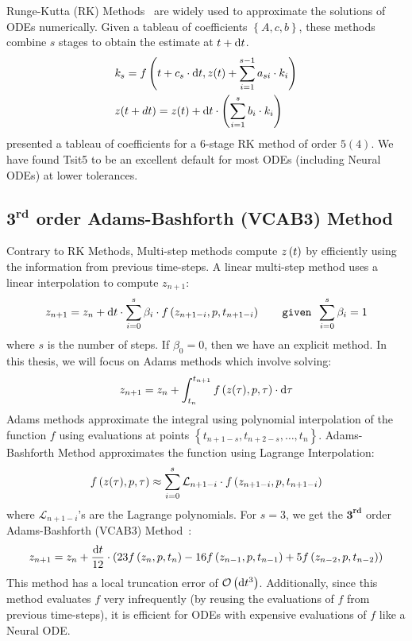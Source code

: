 Runge-Kutta (RK) Methods~\citep{runge1895numerische, kutta1901beitrag} are widely used to approximate the solutions of ODEs numerically. Given a tableau of coefficients $\left\{A, c, b\right\}$, these methods combine $s$ stages to obtain the estimate at $t + \mathrm{d}t$.
%
\begin{align}
   & k_s = f\left(t + c_s \cdot \mathrm{d}t, z(t) + \sum_{i = 1}^{s - 1} a_{si} \cdot k_i\right)                     \\
   & z(t + dt) = z(t) + \mathrm{d}t \cdot \left( \sum_{i = 1}^s b_i \cdot k_i \right) \label{eq:rk_method_tsit5}
\end{align}
%
\citet{tsitouras2011runge} presented a tableau of coefficients for a 6-stage RK method of order $5 (4)$. We have found Tsit5 to be an excellent default for most ODEs (including Neural ODEs) at lower tolerances. 

\subsection{$\mathbf{3^{rd}}$ order Adams-Bashforth (VCAB3) Method}
\label{subsec:vcab3_method}

Contrary to RK Methods, Multi-step methods compute $z\left(t\right)$ by efficiently using the information from previous time-steps. A linear multi-step method uses a linear interpolation to compute $z_{n + 1}$:
%
\begin{equation}
  z_{n + 1} = z_n + \mathrm{d}t \cdot \sum_{i = 0}^{s} \beta_i \cdot f\left(z_{n + 1 - i}, p, t_{n + 1 - i}\right) \qquad \texttt{given } \sum_{i = 0}^s \beta_i = 1
\end{equation}
%
where $s$ is the number of steps. If $\beta_0 = 0$, then we have an explicit method. In this thesis, we will focus on Adams methods which involve solving:
%
\begin{equation}
  z_{n + 1} = z_n + \int_{t_n}^{t_{n + 1}} f\left(z(\tau), p, \tau\right) \cdot \mathrm{d}\tau
\end{equation}
%
Adams methods approximate the integral using polynomial interpolation of the function $f$ using evaluations at points $\left\{ t_{n + 1 - s}, t_{n + 2 - s}, \dots, t_{n} \right\}$. Adams-Bashforth Method approximates the function using Lagrange Interpolation:
%
\begin{equation}
  f\left(z(\tau), p, \tau\right) \approx \sum_{i = 0}^{s} \mathcal{L}_{n + 1 - i} \cdot f\left(z_{n + 1 - i}, p, t_{n + 1 - i}\right)
\end{equation}
%
where $\mathcal{L}_{n + 1 - i}$'s are the Lagrange polynomials. For $s = 3$, we get the $\mathbf{3^{rd}}$ order Adams-Bashforth (VCAB3) Method~\citep{durran1991third}:
%
\begin{equation}
  z_{n + 1} = z_n + \frac{\mathrm{d}t}{12} \cdot \left( 23 f\left(z_n, p, t_n\right) - 16 f\left(z_{n - 1}, p, t_{n - 1}\right) + 5 f\left(z_{n - 2}, p, t_{n - 2}\right) \right)
\end{equation}
%
This method has a local truncation error of $\mathcal{O}\left(\mathrm{d}t^3\right)$. Additionally, since this method evaluates $f$ very infrequently (by reusing the evaluations of $f$ from previous time-steps), it is efficient for ODEs with expensive evaluations of $f$ like a Neural ODE.


